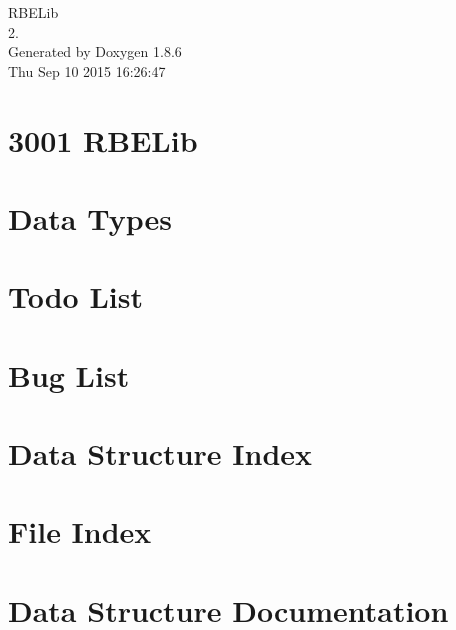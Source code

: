\documentclass[twoside]{book}
\newcommand{\clearemptydoublepage}{%
  \newpage{\pagestyle{empty}\cleardoublepage}%
}
\begin{document}
\hypersetup{pageanchor=false}
\begin{titlepage}
\vspace*{7cm}
\begin{center}%
{\Large R\-B\-E\-Lib \\[1ex]\large 2. }\\
\vspace*{1cm}
{\large Generated by Doxygen 1.8.6}\\
\vspace*{0.5cm}
{\small Thu Sep 10 2015 16:26:47}\\
\end{center}
\end{titlepage}
\clearemptydoublepage
\tableofcontents
\clearemptydoublepage
{}
\hypersetup{pageanchor=true}

\chapter{3001 R\-B\-E\-Lib}
\label{index}\hypertarget{index}{}
\chapter{Data Types}
\label{datatypes}
\hypertarget{datatypes}{}

\chapter{Todo List}
\label{todo}
\hypertarget{todo}{}

\chapter{Bug List}
\label{bug}
\hypertarget{bug}{}

\chapter{Data Structure Index}

\chapter{File Index}

\chapter{Data Structure Documentation}



\end{document}

